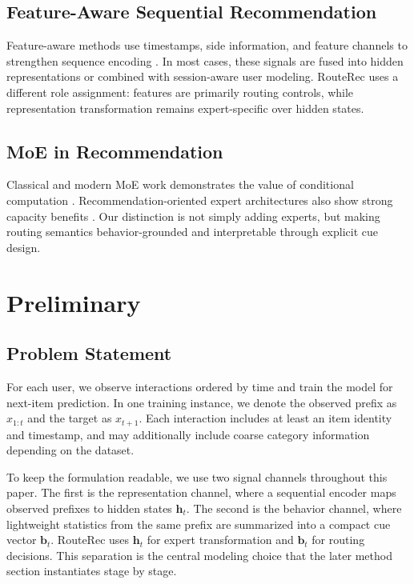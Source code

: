 \documentclass[sigconf,review,anonymous]{acmart}
\begin{document}
\subsection{Feature-Aware Sequential Recommendation}
Feature-aware methods use timestamps, side information, and feature channels to strengthen sequence encoding \cite{li2020tisasrec,zhang2019fdsa,xie2022difsr,du2023fearec,bauer2023hybridsession}. In most cases, these signals are fused into hidden representations or combined with session-aware user modeling. RouteRec uses a different role assignment: features are primarily routing controls, while representation transformation remains expert-specific over hidden states.

\subsection{MoE in Recommendation}
Classical and modern MoE work demonstrates the value of conditional computation \cite{jacobs1991adaptive,jordan1994hme,shazeer2017moe,fedus2022switch}. Recommendation-oriented expert architectures also show strong capacity benefits \cite{ma2018mmoe,tang2020ple,liu2025fame,bian2023m3srec,zhang2025hm4sr}. Our distinction is not simply adding experts, but making routing semantics behavior-grounded and interpretable through explicit cue design.

\section{Preliminary}
\label{sec:prelim}

\subsection{Problem Statement}
For each user, we observe interactions ordered by time and train the model for next-item prediction. In one training instance, we denote the observed prefix as $x_{1:t}$ and the target as $x_{t+1}$. Each interaction includes at least an item identity and timestamp, and may additionally include coarse category information depending on the dataset.

To keep the formulation readable, we use two signal channels throughout this paper. The first is the representation channel, where a sequential encoder maps observed prefixes to hidden states $\mathbf{h}_t$. The second is the behavior channel, where lightweight statistics from the same prefix are summarized into a compact cue vector $\mathbf{b}_t$. RouteRec uses $\mathbf{h}_t$ for expert transformation and $\mathbf{b}_t$ for routing decisions. This separation is the central modeling choice that the later method section instantiates stage by stage.
\end{document}
